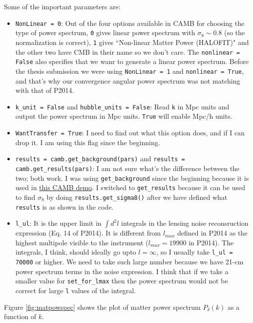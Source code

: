 \documentclass[12pt]{article}
\numberwithin{equation}{section}
\begin{document}
Some of the important parameters are:
\begin{itemize}
	\item \verb|NonLinear = 0|: Out of the four options available in CAMB for choosing the type of power spectrum, \verb|0| gives linear power spectrum with $ \sigma_8 \sim 0.8$ (so the normalization is correct), \verb|1| gives ``Non-linear Matter Power (HALOFIT)" and the other two have CMB in their name so we don't care. The \verb|nonlinear = False| also specifies that we wanr to generate a linear power spectrum. Before the thesis submission we were using \verb|NonLinear = 1| and \verb|nonlinear = True|, and that's why our convergence angular power spectrum was not matching with that of P2014. 
	\item \verb|k_unit = False| and \verb|hubble_units = False|: Read \verb|k| in Mpc units and output the power spectrum in Mpc units. \verb|True| will enable Mpc/h units.
	\item \verb|WantTransfer = True|: I need to find out what this option does, and if I can drop it. I am using this flag since the beginning.
	\item \verb|results = camb.get_background(pars)| and \verb|results = camb.get_results(pars)|: I am not sure what's the difference between the two; both work. I was using \verb|get_background| since the beginning because it is used in \href{https://camb.readthedocs.io/en/latest/CAMBdemo.html}{this CAMB demo}. I switched to \verb|get_results| because it can be used to find $\sigma_8$ by doing \verb|results.get_sigma8()| after we have defined what \verb|results| is as shown in the code.
	\item \verb|l_ul|: It is the upper limit in $ \int d^2l $ integrals in the lensing noise reconsruction expression (Eq. 14 of P2014). It is different from $ l_{max} $ defined in P2014 as the highest multipole visible to the instrument ($ l_{max}  = 19900 $ in P2014). The integrals, I think, should ideally go upto $ l = \infty $, so I usually take \verb|l_ul = 70000| or higher. We need to take such large number because we have 21-cm power spectrum terms in the noise expression. I think that if we take a smaller value for \verb|set_for_lmax| then the power spectrum would not be correct for large \verb|l| values of the integral.
\end{itemize}
Figure \ref{fig:matpowspec} shows the plot of matter power spectrum $ P_\delta(k) $ as a function of $ k $.
\end{document}
